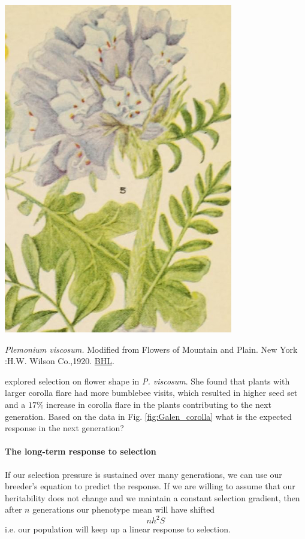 \begin{marginfigure}
\begin{center}
\includegraphics[width=0.75\textwidth]{illustration_images/Quant_gen/Polemonium_viscosum_Galen/Polemonium_viscosum.jpg}
\end{center}
\caption{{\it Plemonium viscosum.}  Modified from Flowers of Mountain and Plain. New York :H.W. Wilson Co.,1920. \href{https://www.flickr.com/photos/biodivlibrary/8220461305/in/album-72157632108046380/}{BHL}. }
\end{marginfigure}


\begin{question}
\citet{galen:96} explored selection on flower shape in
{\it P. viscosum}.  She found that plants with larger corolla flare
had more bumblebee visits, which resulted in higher seed set and a
$17\%$ increase in corolla flare in the plants contributing to the
next generation. Based on the data in Fig. \ref{fig:Galen_corolla}
what is the expected response in the next generation?
\end{question}




\paragraph{The long-term response to selection}
If our selection pressure is sustained over many generations, we can
use our breeder's equation to predict the response. If we are willing
to assume that our heritability does not change and we maintain a constant selection
gradient, then after $n$ generations our phenotype mean will have
shifted 
\begin{equation}
n h^2 S
\end{equation}
i.e. our population will keep up a linear response to selection.

